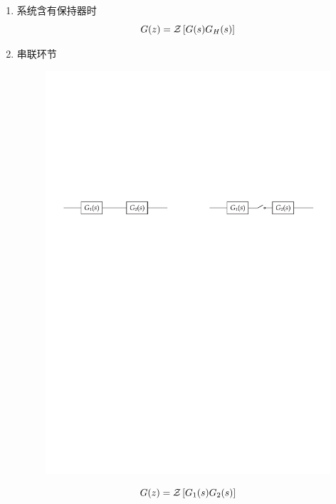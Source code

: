 \begin{enumerate}
    \item 系统含有保持器时
    \begin{equation}
        G(z) = \mathcal{Z}\left[G(s) G_H(s)\right]
    \end{equation}
    \item 串联环节
    \begin{figure}[H]
        \centering
        \includegraphics[scale=0.7]{figures/figure2.1.pdf}
    \end{figure}

    \begin{multicols}{2}
        \begin{equation}
            G(z) = \mathcal{Z}\left[G_1(s) G_2(s)\right]
        \end{equation}


\end{multicols}
\end{enumerate}

